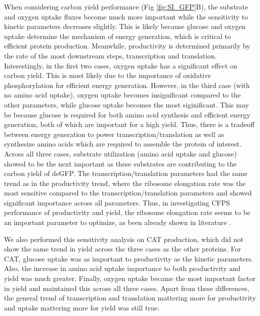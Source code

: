 \documentclass[journal=asbcd6,manuscript=article]{achemso}
\begin{document}
When considering carbon yield performance (Fig \ref{fig:SI_GFP}B), the substrate and oxygen uptake fluxes become much more important while the sensitivity to kinetic parameters decreases slightly.
This is likely because glucose and oxygen uptake determine the mechanism of energy generation, which is critical to efficient protein production.
Meanwhile, productivity is determined primarily by the rate of the most downstream steps, transcription and translation.
Interestingly, in the first two cases, oxygen uptake has a significant effect on carbon yield.
This is most likely due to the importance of oxidative phosphorylation for efficient energy generation.
However, in the third case (with no amino acid uptake), oxygen uptake becomes insignificant compared to the other parameters, while glucose uptake becomes the most siginificant.  
This may be because glucose is required for both amino acid synthesis and efficient energy generation, both of which are important for a high yield.
Thus, there is a tradeoff between energy generation to power transcription/translation as well as synthesize amino acids which are required to assemble the protein of interest. 
Across all three cases, substrate utilization (amino acid uptake and glucose) showed to be the next important as these substrates are contributing to the carbon yield of deGFP.
The transcription/translation parameters had the same trend as in the productivity trend, where the ribosome elongation rate was the most sensitive compared to the transcription/translation parameters and showed significant importance across all parameters. 
Thus, in investigating CFPS performance of productivity and yield, the ribosome elongation rate seems to be an important parameter to optimize, as been already shown in literature \cite{2005_underwood_biotech, 2014_li_PlosOne}. 

We also performed this sensitivity analysis on CAT production, which did not show the same trend in yield across the three cases as the other proteins.
For CAT, glucose uptake was as important to productivity as the kinetic parameters.
Also, the increase in amino acid uptake importance to both productivity and yield was much greater.
Finally, oxygen uptake became the most important factor in yield and maintained this across all three cases.
Apart from these differences, the general trend of transcription and translation mattering more for productivity and uptake mattering more for yield was still true.
\end{document}
